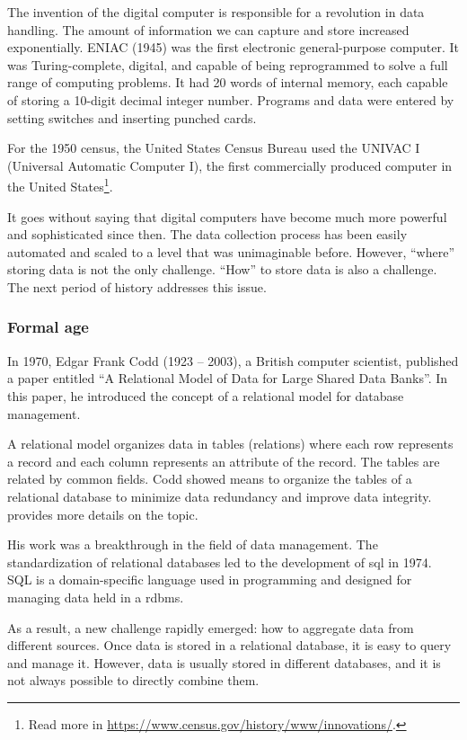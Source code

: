 The invention of the digital computer is responsible for a revolution in data handling.
The amount of information we can capture and store increased exponentially.  ENIAC (1945) was
the first electronic general-purpose computer.  It was Turing-complete, digital, and
capable of being reprogrammed to solve a full range of computing problems.
It had 20 words of internal memory, each capable of storing a 10-digit decimal integer number.
Programs and data were entered by setting switches and inserting punched cards.

For the 1950 census, the United States Census Bureau used the
UNIVAC I (Universal Automatic Computer I), the first commercially produced computer in the
United States\footnote{Read more in \url{https://www.census.gov/history/www/innovations/}.}.

It goes without saying that digital computers have become much more powerful and
sophisticated since then.  The data collection process has been easily automated and
scaled to a level that was unimaginable before.  However, ``where'' storing data is
not the only challenge.  ``How'' to store data is also a challenge.  The next period of
history addresses this issue.

\subsubsection{Formal age}

In 1970, Edgar Frank Codd (1923 -- 2003), a British computer scientist,
published a paper entitled ``A Relational Model
of Data for Large Shared Data Banks''.  In this paper, he introduced
the concept of a relational model for database management.

A relational model organizes data in tables (relations) where each row represents a record
and each column represents an attribute of the record.  The tables are related by common
fields.  Codd showed means to organize the tables of a relational database to minimize
data redundancy and improve data integrity.   provides more details
on the topic.

His work was a breakthrough in the field of data management.  The standardization of
relational databases led to the development of \gls{sql} in 1974.
SQL is a domain-specific language used in programming and designed for managing data held
in a \gls{rdbms}.

As a result, a new challenge rapidly emerged: how to aggregate data from different
sources. Once data is stored in a relational database, it is easy to query and manage
it. However, data is usually stored in different databases, and it is not always possible
to directly combine them.

